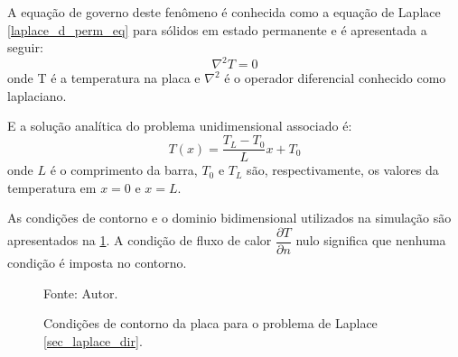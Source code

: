 A equação de governo deste fenômeno é conhecida como a equação de Laplace \eqref{laplace_d_perm_eq} para sólidos em estado permanente e é apresentada a seguir:
\begin{equation}
    \nabla^2 T = 0
    \label{laplace_d_perm_eq} 
\end{equation}
onde T é a temperatura na placa e $\nabla^2$ é o operador diferencial conhecido como laplaciano.

E a solução analítica do problema unidimensional associado é:
\begin{equation}
    T(x) = \dfrac{T_L-T_0}{L} x + T_0
    \label{laplace_d_sol}
\end{equation}
onde $L$ é o comprimento da barra, $T_0$ e $T_L$ são, respectivamente, os valores da temperatura em $x=0$ e $x=L$.

As condições de contorno e o dominio bidimensional utilizados na simulação são apresentados na \ref{laplace_d_bc}. A condição de fluxo de calor $\dfrac{\partial T}{\partial n}$ nulo significa que nenhuma condição é imposta no contorno.

\begin{figure}[H]
    \centering
     {\raggedleft \scriptsize Fonte: Autor.}
    \caption{Condições de contorno da placa para o problema de Laplace \ref{sec_laplace_dir}.}
    \label{laplace_d_bc}
\end{figure}

